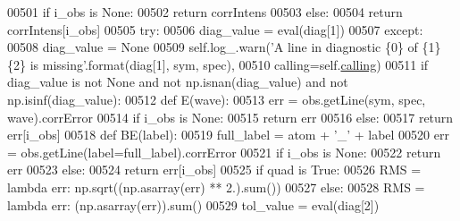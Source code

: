 \begin{DoxyCode}
00501                     \textcolor{keywordflow}{if} i\_obs \textcolor{keywordflow}{is} \textcolor{keywordtype}{None}:
00502                         \textcolor{keywordflow}{return} corrIntens
00503                     \textcolor{keywordflow}{else}:
00504                         \textcolor{keywordflow}{return} corrIntens[i\_obs]
00505                 \textcolor{keywordflow}{try}:
00506                     diag\_value = eval(diag[1])
00507                 \textcolor{keywordflow}{except}:
00508                     diag\_value = \textcolor{keywordtype}{None}
00509                     self.log\_.warn(\textcolor{stringliteral}{'A line in diagnostic \{0\} of \{1\}\{2\} is missing'}.format(diag[1], sym, 
      spec),
00510                                    calling=self.\hyperlink{classpyneb_1_1core_1_1diags_1_1_diagnostics_a07dce673fec8b2383ef411ab94b0b2fe}{calling})
00511                 \textcolor{keywordflow}{if} diag\_value \textcolor{keywordflow}{is} \textcolor{keywordflow}{not} \textcolor{keywordtype}{None} \textcolor{keywordflow}{and} \textcolor{keywordflow}{not} np.isnan(diag\_value) \textcolor{keywordflow}{and} \textcolor{keywordflow}{not} np.isinf(diag\_value):
00512                     \textcolor{keyword}{def }E(wave):
00513                         err = obs.getLine(sym, spec, wave).corrError
00514                         \textcolor{keywordflow}{if} i\_obs \textcolor{keywordflow}{is} \textcolor{keywordtype}{None}:
00515                             \textcolor{keywordflow}{return} err
00516                         \textcolor{keywordflow}{else}:
00517                             \textcolor{keywordflow}{return} err[i\_obs]
00518                     \textcolor{keyword}{def }BE(label):
00519                         full\_label = atom + \textcolor{stringliteral}{'\_'} + label
00520                         err = obs.getLine(label=full\_label).corrError
00521                         \textcolor{keywordflow}{if} i\_obs \textcolor{keywordflow}{is} \textcolor{keywordtype}{None}:
00522                             \textcolor{keywordflow}{return} err
00523                         \textcolor{keywordflow}{else}:
00524                             \textcolor{keywordflow}{return} err[i\_obs]
00525                     \textcolor{keywordflow}{if} quad \textcolor{keywordflow}{is} \textcolor{keyword}{True}:
00526                         RMS = \textcolor{keyword}{lambda} err: np.sqrt((np.asarray(err) ** 2.).sum())
00527                     \textcolor{keywordflow}{else}:
00528                         RMS = \textcolor{keyword}{lambda} err: (np.asarray(err)).sum() 
00529                     tol\_value = eval(diag[2])

\end{DoxyCode}
